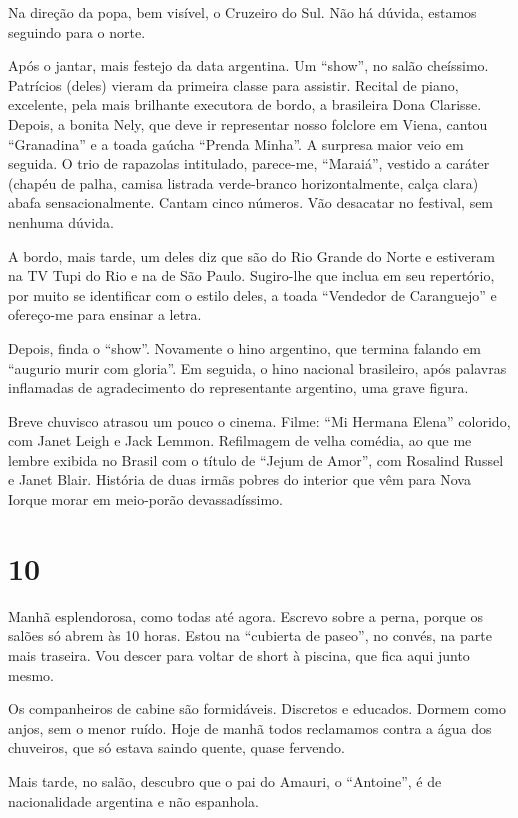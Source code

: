 Na direção da popa, bem visível, o Cruzeiro do Sul. Não há dúvida, estamos seguindo para o norte.

Após o jantar, mais festejo da data argentina. Um ``show'', no salão cheíssimo. Patrícios (deles) vieram da primeira classe para assistir. Recital de piano, excelente, pela mais brilhante executora de bordo, a brasileira Dona Clarisse. Depois, a bonita Nely, que deve ir representar nosso folclore em Viena, cantou ``Granadina'' e a toada gaúcha ``Prenda Minha''. A surpresa maior veio em seguida. O trio de rapazolas intitulado, parece-me, ``Maraiá'', vestido a caráter (chapéu de palha, camisa listrada verde-branco horizontalmente, calça clara) abafa sensacionalmente. Cantam cinco números. Vão desacatar no festival, sem nenhuma dúvida.

A bordo, mais tarde, um deles diz que são do Rio Grande do Norte e estiveram na TV Tupi do Rio e na de São Paulo. Sugiro-lhe que inclua em seu repertório, por muito se identificar com o estilo deles, a toada ``Vendedor de Caranguejo'' e ofereço-me para ensinar a letra.

Depois, finda o ``show''. Novamente o hino argentino, que termina falando em ``augurio murir com gloria''. Em seguida, o hino nacional brasileiro, após palavras inflamadas de agradecimento do representante argentino, uma grave figura.

Breve chuvisco atrasou um pouco o cinema. Filme: ``Mi Hermana Elena'' colorido, com Janet Leigh e Jack Lemmon. Refilmagem de velha comédia, ao que me lembre exibida no Brasil com o título de ``Jejum de Amor'', com Rosalind Russel e Janet Blair. História de duas irmãs pobres do interior que vêm para Nova Iorque morar em meio-porão devassadíssimo.

\section*{10 \adfflatleafright {}}

Manhã esplendorosa, como todas até agora. Escrevo sobre a perna, porque os salões só abrem às 10 horas. Estou na ``cubierta de paseo'', no convés, na parte mais traseira. Vou descer para voltar de short à piscina, que fica aqui junto mesmo.

Os companheiros de cabine são formidáveis. Discretos e educados. Dormem como anjos, sem o menor ruído. Hoje de manhã todos reclamamos contra a água dos chuveiros, que só estava saindo quente, quase fervendo.

Mais tarde, no salão, descubro que o pai do Amauri, o ``Antoine'', é de nacionalidade argentina e não espanhola.

